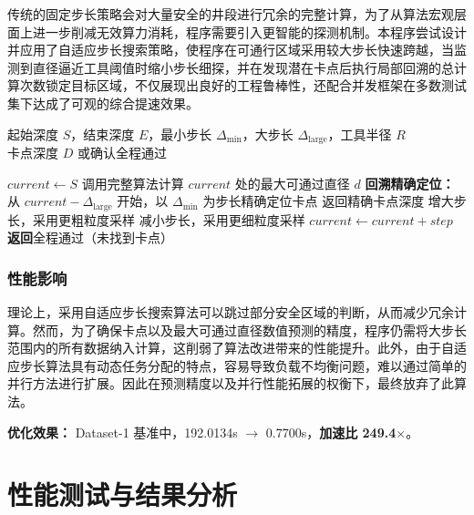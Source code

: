 \documentclass[12pt]{article}
\begin{document}
传统的固定步长策略会对大量安全的井段进行冗余的完整计算，为了从算法宏观层面上进一步削减无效算力消耗，程序需要引入更智能的探测机制。本程序尝试设计并应用了自适应步长搜索策略，使程序在可通行区域采用较大步长快速跨越，当监测到直径逼近工具阈值时缩小步长细探，并在发现潜在卡点后执行局部回溯的总计算次数锁定目标区域，不仅展现出良好的工程鲁棒性，还配合并发框架在多数测试集下达成了可观的综合提速效果。

\begin{algorithm}[htbp]
    \caption{自适应步长搜索算法}
    \label{alg:adaptive_search}
    \begin{algorithmic}[1]
        \REQUIRE 起始深度 $S$，结束深度 $E$，最小步长 $\Delta_{\min}$，大步长 $\Delta_{\text{large}}$，工具半径 $R$ \\
        \ENSURE 卡点深度 $D$ 或确认全程通过

        \STATE $current \leftarrow S$
            \STATE 调用完整算法计算 $current$ 处的最大可通过直径 $d$
                \STATE \textbf{回溯精确定位：}从 $current - \Delta_{\text{large}}$ 开始，以 $\Delta_{\min}$ 为步长精确定位卡点
                \STATE 返回精确卡点深度
            \ENDIF
                \STATE 增大步长，采用更粗粒度采样
            \ELSE
                    \STATE 减小步长，采用更细粒度采样
                \ENDIF
            \ENDIF
            \STATE $current \leftarrow current + step$
        \ENDWHILE
        \STATE \textbf{返回}全程通过（未找到卡点）
    \end{algorithmic}
\end{algorithm}

\subsubsection{性能影响}

理论上，采用自适应步长搜索算法可以跳过部分安全区域的判断，从而减少冗余计算。然而，为了确保卡点以及最大可通过直径数值预测的精度，程序仍需将大步长范围内的所有数据纳入计算，这削弱了算法改进带来的性能提升。此外，由于自适应步长算法具有动态任务分配的特点，容易导致负载不均衡问题，难以通过简单的并行方法进行扩展。因此在预测精度以及并行性能拓展的权衡下，最终放弃了此算法。

\textbf{优化效果：} Dataset-1 基准中，192.0134s $\rightarrow$ 0.7700s，\textbf{加速比 249.4$\times$}。
\section{性能测试与结果分析}
\end{document}
